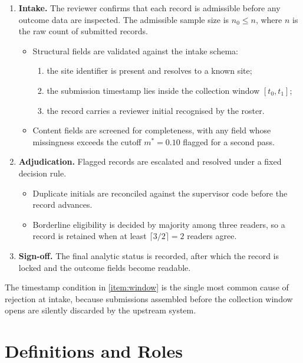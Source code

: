 \documentclass[11pt]{article}
\begin{document}
\begin{enumerate}[label=\arabic*.]
\item \textbf{Intake.} The reviewer confirms that each record is admissible
  before any outcome data are inspected. The admissible sample size is
  $n_0 \leq n$, where $n$ is the raw count of submitted records.
  \begin{itemize}
  \item Structural fields are validated against the intake schema:
    \begin{enumerate}[label=(\roman*)]
    \item the site identifier is present and resolves to a known site;
    \item the submission timestamp lies inside the collection window
      $[t_0, t_1]$; \label{item:window}
    \item the record carries a reviewer initial recognised by the roster.
    \end{enumerate}
  \item Content fields are screened for completeness, with any field whose
    missingness exceeds the cutoff $m^{\ast} = 0.10$ flagged for a second pass.
  \end{itemize}
\item \textbf{Adjudication.} Flagged records are escalated and resolved under a
  fixed decision rule.
  \begin{itemize}
  \item Duplicate initials are reconciled against the supervisor code before the
    record advances.
  \item Borderline eligibility is decided by majority among three readers, so a
    record is retained when at least $\lceil 3/2 \rceil = 2$ readers agree.
  \end{itemize}
\item \textbf{Sign-off.} The final analytic status is recorded, after which the
  record is locked and the outcome fields become readable.
\end{enumerate}

The timestamp condition in \cref{item:window} is the single most common cause of
rejection at intake, because submissions assembled before the collection window
opens are silently discarded by the upstream system.

\section{Definitions and Roles}
\label{sec:definitions}
\end{document}
